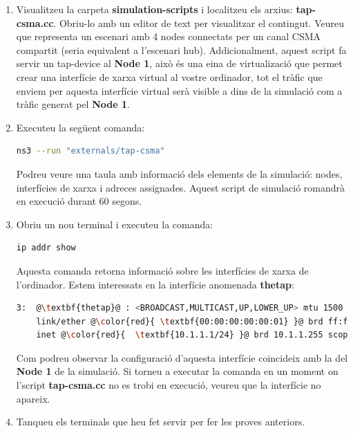 \documentclass[12pt,a4paper]{article}
\begin{document}
\begin{enumerate}
\item Visualitzeu la carpeta \textbf{simulation-scripts} i localitzeu els arxius: \textbf{tap-csma.cc}. Obriu-lo amb un editor de text per visualitzar el contingut.
Veureu que representa un escenari amb 4 nodes connectats per un canal CSMA compartit (seria equivalent a l'escenari hub).
\newline
Addicionalment, aquest script fa servir un tap-device al \textbf{Node 1}, això és una eina de virtualizació
que permet crear una interfície de xarxa virtual al vostre ordinador, tot el tràfic que enviem per aquesta interfície virtual
serà visible a dins de la simulació com a tràfic generat pel \textbf{Node 1}.

\item Executeu la següent comanda: 
\begin{lstlisting}[language=bash]
ns3 --run "externals/tap-csma" 
\end{lstlisting}
Podreu veure una taula amb informació dels elements de la simulació: nodes, interfícies de xarxa i adreces assignades. Aquest script de simulació romandrà en execució durant 60 segons.
\item Obriu un nou terminal i executeu la comanda:
\begin{lstlisting}[language=bash]
ip addr show
\end{lstlisting}
Aquesta comanda retorna informació sobre les interfícies de xarxa de l'ordinador. Estem interessats en la interfície anomenada \textbf{thetap}:

\begin{lstlisting}[escapechar=@,language=bash,basicstyle=\footnotesize]
3:  @\textbf{thetap}@ : <BROADCAST,MULTICAST,UP,LOWER_UP> mtu 1500 qdisc fq_codel 
    link/ether @\color{red}{ \textbf{00:00:00:00:00:01} }@ brd ff:ff:ff:ff:ff:ff
    inet @\color{red}{  \textbf{10.1.1.1/24} }@ brd 10.1.1.255 scope global thetap
\end{lstlisting}

Com podreu observar la configuració d'aquesta interfície coincideix amb la del \textbf{Node 1} de la simulació.
Si torneu a executar la comanda en un moment on l'script \textbf{tap-csma.cc} no es trobi en execució,
veureu que la interfície no apareix.

\item Tanqueu els terminals que heu fet servir per fer les proves anteriors.


\end{enumerate}
\end{document}
